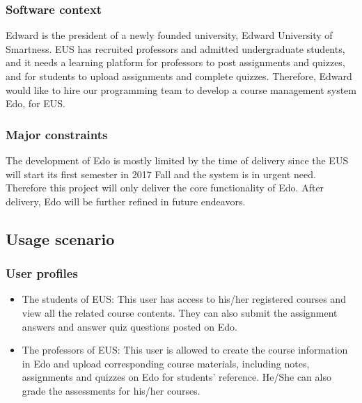 \documentclass[paper=a4, fontsize=11pt]{scrartcl}
\numberwithin{equation}{section}		%
\numberwithin{figure}{section}			%
\numberwithin{table}{section}				%
\begin{document}
\subsubsection{Software context}
Edward is the president of a newly founded university, Edward University of Smartness. EUS has recruited professors and admitted undergraduate students, and it needs a learning platform for professors to post assignments and quizzes, and for students to upload assignments and complete quizzes. Therefore, Edward would like to hire our programming team to develop a course management system Edo, for EUS.
\subsubsection{Major constraints}
The development of Edo is mostly limited by the time of delivery since the EUS will start its first semester in 2017 Fall and the system is in urgent need. Therefore this project will only deliver the core functionality of Edo. After delivery, Edo will be further refined in future endeavors.

\subsection{Usage scenario}

\subsubsection{User profiles}
\begin{itemize}
	\item The students of EUS: This user has access to his/her registered courses and view all the related course contents. They can also submit the assignment answers and answer quiz questions posted on Edo.
	\item The professors of EUS: This user is allowed to create the course information in Edo and upload corresponding course materials, including notes, assignments and quizzes on Edo for students' reference. He/She can also grade the assessments for his/her courses.
\end{itemize}
\end{document}
